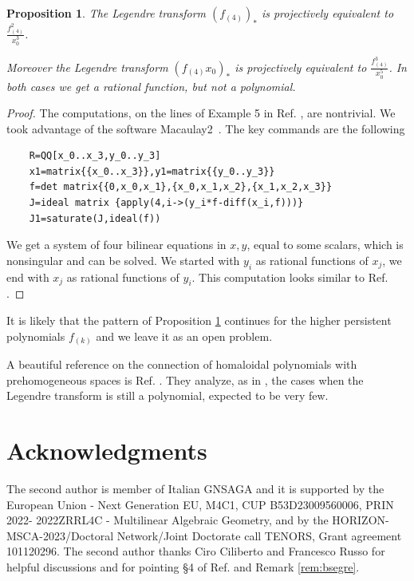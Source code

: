 \documentclass[aps,floatfix,groupedaddress,superscriptaddress,longbibliography,footinbib,notitlepage,showpacs]{revtex4-1}
\newtheorem{proposition}[theorem]{Proposition}
\begin{document}
\begin{proposition}\label{prop:legendre}
The Legendre transform $\left(f_{(4)}\right)_*$ is projectively equivalent to $\frac{f_{(4)}^2}{x_0^3}$.

Moreover the Legendre transform $\left(f_{(4)}x_0\right)_*$ is projectively equivalent to $\frac{f_{(4)}^3}{x_0^5}$. In both cases we get a rational function, but not a polynomial.
\end{proposition}
\begin{proof}
The computations, on the lines of Example 5 in Ref. \cite{Dol}, are nontrivial. We took advantage of the software Macaulay2~\cite{GS}. The key commands are the following
\begin{verbatim}
    R=QQ[x_0..x_3,y_0..y_3]
    x1=matrix{{x_0..x_3}},y1=matrix{{y_0..y_3}}
    f=det matrix{{0,x_0,x_1},{x_0,x_1,x_2},{x_1,x_2,x_3}}
    J=ideal matrix {apply(4,i->(y_i*f-diff(x_i,f)))}
    J1=saturate(J,ideal(f))
\end{verbatim}

We get a system of four bilinear equations in $x,y$, equal to some scalars, which is nonsingular and can be solved. We started with $y_i$ as rational functions of $x_j$, we end with $x_j$ as rational functions of $y_i$. This computation looks similar to Ref. \cite[Proposition 4.5]{CRS}.
\end{proof}

It is likely that the pattern of Proposition \ref{prop:legendre} continues for the higher persistent polynomials $f_{(k)}$ and we leave it as an open problem.

A beautiful reference on the connection of homaloidal polynomials with prehomogeneous spaces is Ref. \cite{CS}. They analyze, as in \cite{EKP}, the cases when the Legendre transform is still a polynomial, expected to be very few.

\section*{Acknowledgments}
The second author is member of Italian GNSAGA and it is supported by the European Union - Next Generation EU, M4C1, CUP B53D23009560006, PRIN 2022- 2022ZRRL4C - Multilinear Algebraic Geometry, and by the HORIZON-MSCA-2023/Doctoral Network/Joint Doctorate call
TENORS, Grant agreement 101120296. The second author thanks Ciro Ciliberto and Francesco Russo for helpful discussions and for pointing \S 4 of Ref. \cite{CRS}
and Remark \ref{rem:bsegre}. 
\end{document}
